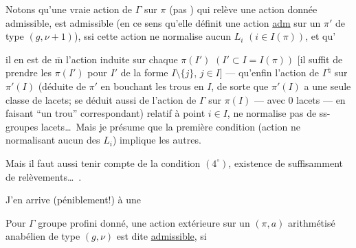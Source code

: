 
Notons qu'une vraie action de $\Gamma$ sur $\pi$
(pas  ) qui relève une action
donnée\unsure{$+$} admissible, est  admissible
(en ce sens qu'elle définit une
action  \uline{adm} sur un $\pi'$ de
type $(g,\nu+1)$), ssi cette action  ne
normalise aucun $L_i$ $(i\in I(\pi))$, et qu'

il en est de $\overline{\mathrm m}$  l'action induite sur chaque $\pi(I')$ $(I'\subset I=I(\pi))$ [il suffit de prendre les $\pi(I')$ pour $I'$ de la forme $I\setminus\{j\}$, $j\in I$] ---  qu'enfin l'action de $\Gamma^{\natural}$  sur $\pi'(I)$ (déduite de $\pi'$ en bouchant les trous en $I$, de sorte que $\pi'(I)$ a une seule classe de lacets;  se déduit aussi de l'action  de $\Gamma$ sur $\pi(I)$ --- avec $0$  lacets --- en faisant ``un trou'' correspondant) relatif à  point $i\in I$, ne normalise pas de ss-groupes lacets\ldots\ Mais je présume que la première condition (action  ne normalisant aucun des $L_i$) implique les autres.


Mais il faut  aussi tenir compte de la condition $(4^\circ)$, existence de suffisamment de relèvements\ldots\ .

J'en arrive (péniblement!) à une

 Pour $\Gamma$ groupe profini donné, une action extérieure sur un $(\pi,a)$ arithmétisé anabélien de type $(g,\nu)$ est dite \uline{admissible}, si

